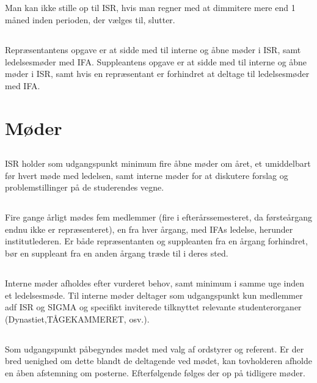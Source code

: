 \documentclass[danish,a4paper,twocolumn]{article}
\begin{document}
\subsection{}
Man kan ikke stille op til ISR, hvis man regner med at dimmitere mere end 1
måned inden perioden, der vælges til, slutter.
\subsection{}
Repræsentantens opgave er at sidde med til interne og åbne møder i ISR, samt
ledelsesmøder med IFA. Suppleantens opgave er at sidde med til interne og åbne møder i ISR, samt hvis en repræsentant er forhindret at deltage til ledelsesmøder med IFA.
\section{Møder}
\subsection{}
ISR holder som udgangspunkt minimum fire åbne møder om året, et umiddelbart før hvert møde med ledelsen, samt interne møder for at diskutere forslag og problemstillinger på de studerendes vegne.

\subsection{}
Fire gange årligt mødes fem medlemmer (fire i efterårssemesteret, da førsteårgang endnu ikke er repræsenteret), en fra hver årgang, med IFAs ledelse, herunder institutlederen. Er både repræsentanten og suppleanten fra en årgang forhindret, bør en suppleant fra en anden årgang træde til i deres sted.

\subsection{}
Interne møder afholdes efter vurderet behov, samt minimum i samme uge inden
et ledelsesmøde. Til interne møder deltager som udgangspunkt kun medlemmer
adf ISR og SIGMA og specifikt inviterede tilknyttet relevante studenterorganer (Dynastiet,TÅGEKAMMERET, osv.). 
\subsection{}
Som udgangspunkt påbegyndes mødet med valg af ordstyrer og referent. Er
der bred uenighed om dette blandt de deltagende ved mødet, kan tovholderen
afholde en åben afstemning om posterne. Efterfølgende følges der op på tidligere møder. 
\end{document}

